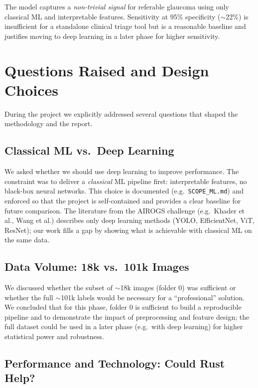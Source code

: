 \documentclass[11pt,a4paper]{article}
\begin{document}
The model captures a \emph{non-trivial signal} for referable glaucoma using only classical ML and interpretable features. Sensitivity at 95\% specificity ($\sim$22\%) is insufficient for a standalone clinical triage tool but is a reasonable baseline and justifies moving to deep learning in a later phase for higher sensitivity.

\section{Questions Raised and Design Choices}

During the project we explicitly addressed several questions that shaped the methodology and the report.

\subsection{Classical ML vs.\ Deep Learning}

We asked whether we should use deep learning to improve performance. The constraint was to deliver a \emph{classical} ML pipeline first: interpretable features, no black-box neural networks. This choice is documented (e.g.\ \texttt{SCOPE\_ML.md}) and enforced so that the project is self-contained and provides a clear baseline for future comparison. The literature from the AIROGS challenge (e.g.\ Khader et al., Wang et al.) describes only deep learning methods (YOLO, EfficientNet, ViT, ResNet); our work fills a gap by showing what is achievable with classical ML on the same data.

\subsection{Data Volume: 18k vs.\ 101k Images}

We discussed whether the subset of $\sim$18k images (folder 0) was sufficient or whether the full $\sim$101k labels would be necessary for a ``professional'' solution. We concluded that for this phase, folder 0 is sufficient to build a reproducible pipeline and to demonstrate the impact of preprocessing and feature design; the full dataset could be used in a later phase (e.g.\ with deep learning) for higher statistical power and robustness.

\subsection{Performance and Technology: Could Rust Help?}
\end{document}
